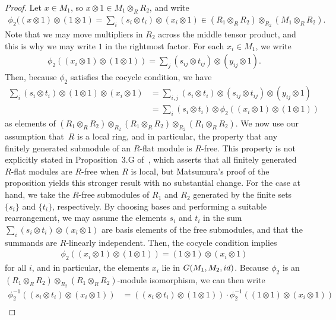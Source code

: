 \documentclass[11pt]{article}
\theoremstyle{definition}
\begin{document}
\begin{proof}
Let $x \in M_1$, so $x \otimes 1 \in M_1 \otimes_{R} R_2$, and write
\begin{gather*} \phi_2((x \otimes 1) \otimes (1 \otimes 1) = \sum_i (s_i \otimes t_i) \otimes (x_i \otimes 1) \in (R_1 \otimes_{R} R_2) \otimes_{R_2} (M_1 \otimes_{R} R_2). \end{gather*}
Note that we may move multipliers in $R_2$ across the middle tensor product, and this is why we may write $1$ in the rightmost factor. For each $x_i \in M_1$, we write
\begin{gather*} \phi_2((x_i \otimes 1) \otimes (1 \otimes 1)) = \sum_j (s_{ij} \otimes t_{ij}) \otimes (y_{ij} \otimes 1). \end{gather*}
Then, because $\phi_2$ satisfies the cocycle condition, we have
 \begin{align*} \sum_i (s_i \otimes t_i) \otimes (1 \otimes 1) \otimes (x_i \otimes 1) &= \sum_{i,j} (s_i \otimes t_i) \otimes (s_{ij} \otimes t_{ij}) \otimes (y_{ij} \otimes 1) \\
&= \sum_i (s_i \otimes t_i) \otimes \phi_2((x_i \otimes 1) \otimes (1 \otimes 1))
\end{align*}
as elements of $(R_1 \otimes_{R} R_2) \otimes_{R_2}(R_1 \otimes_{R} R_2) \otimes_{R_2}(R_1 \otimes_{R} R_2)$. We now use our assumption that~$R$ is a local ring, and in particular, the property that any finitely generated submodule of an $R$-flat module is $R$-free. This property is not explicitly stated in Proposition~3.G of~\cite{M80}, which asserts that all finitely generated $R$-flat modules are $R$-free when $R$ is local, but Matsumura's proof of the proposition yields this stronger result with no substantial change. For the case at hand, we take the $R$-free submodules of $R_1$ and $R_2$ generated by the finite sets $\{ s_i\}$ and $\{t_i\}$, respectively. By choosing bases and performing a suitable rearrangement, we may assume the elements $s_i$ and $t_i$ in the sum $\sum_i (s_i \otimes t_i) \otimes (x_i \otimes 1)$ are basis elements of the free submodules, and that the summands are $R$-linearly independent. Then, the cocycle condition implies
\begin{gather*} \phi_2((x_i \otimes 1) \otimes (1 \otimes 1)) = (1 \otimes 1) \otimes (x_i \otimes 1) \end{gather*}
for all $i$, and in particular, the elements $x_i$ lie in $G(M_1,M_2,{\rm id})$. Because $\phi_2$ is an $(R_1 \otimes_{R} R_2) \otimes_{R_2} (R_1 \otimes_{R} R_2)$-module isomorphism, we can then write
\begin{align*}
\phi_2^{-1}((s_i \otimes t_i) \otimes (x_i \otimes 1)) &= ((s_i \otimes t_i) \otimes (1 \otimes 1))\cdot \phi_2^{-1}((1 \otimes 1) \otimes (x_i \otimes 1)) \\

\end{align*}
\end{proof}
\end{document}
